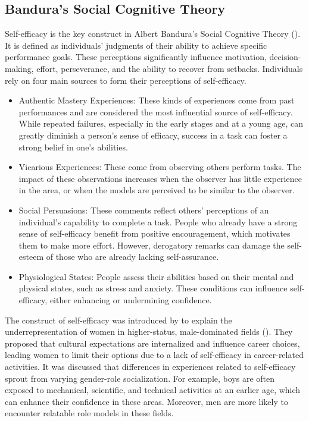 \subsection{Bandura's Social Cognitive Theory}
Self-efficacy is the key construct in Albert Bandura's Social Cognitive Theory (\cite{Zel,Bandura2001}). It is defined as individuals' judgments of their ability to achieve specific performance goals. These perceptions significantly influence motivation, decision-making, effort, perseverance, and the ability to recover from setbacks.
Individuals rely on four main sources to form their perceptions of self-efficacy.
\begin{itemize}
    \item Authentic Mastery Experiences: These kinds of experiences come from past performances and are considered the most influential source of self-efficacy. While repeated failures, especially in the early stages and at a young age, can greatly diminish a person's sense of efficacy, success in a task can foster a strong belief in one's abilities.
    \item Vicarious Experiences: These come from observing others perform tasks. The impact of these observations increases when the observer has little experience in the area, or when the models are perceived to be similar to the observer.
    \item Social Persuasions: These comments reflect others' perceptions of an individual's capability to complete a task. People who already have a strong sense of self-efficacy benefit from positive encouragement, which motivates them to make more effort. However, derogatory remarks can damage the self-esteem of those who are already lacking self-assurance.
    \item Physiological States: People assess their abilities based on their mental and physical states, such as stress and anxiety. These conditions can influence self-efficacy, either enhancing or undermining confidence.
\end{itemize}
The construct of self-efficacy was introduced by \textcite{HACKETT1981326} to explain the underrepresentation of women in higher-status, male-dominated fields (\cite{Zel}). They proposed that cultural expectations are internalized and influence career choices, leading women to limit their options due to a lack of self-efficacy in career-related activities. It was discussed that differences in experiences related to self-efficacy sprout from varying gender-role socialization. For example, boys are often exposed to mechanical, scientific, and technical activities at an earlier age, which can enhance their confidence in these areas. Moreover, men are more likely to encounter relatable role models in these fields.

